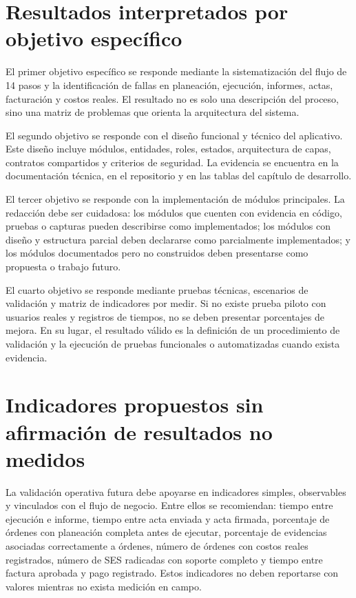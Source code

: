 \section{Resultados interpretados por objetivo específico}
\label{sec:resultados-por-objetivo-especifico}

El primer objetivo específico se responde mediante la sistematización del flujo de 14 pasos y la identificación de fallas en planeación, ejecución, informes, actas, facturación y costos reales. El resultado no es solo una descripción del proceso, sino una matriz de problemas que orienta la arquitectura del sistema.

El segundo objetivo se responde con el diseño funcional y técnico del aplicativo. Este diseño incluye módulos, entidades, roles, estados, arquitectura de capas, contratos compartidos y criterios de seguridad. La evidencia se encuentra en la documentación técnica, en el repositorio y en las tablas del capítulo de desarrollo.

El tercer objetivo se responde con la implementación de módulos principales. La redacción debe ser cuidadosa: los módulos que cuenten con evidencia en código, pruebas o capturas pueden describirse como implementados; los módulos con diseño y estructura parcial deben declararse como parcialmente implementados; y los módulos documentados pero no construidos deben presentarse como propuesta o trabajo futuro.

El cuarto objetivo se responde mediante pruebas técnicas, escenarios de validación y matriz de indicadores por medir. Si no existe prueba piloto con usuarios reales y registros de tiempos, no se deben presentar porcentajes de mejora. En su lugar, el resultado válido es la definición de un procedimiento de validación y la ejecución de pruebas funcionales o automatizadas cuando exista evidencia.

\section{Indicadores propuestos sin afirmación de resultados no medidos}
\label{sec:indicadores-propuestos-no-medidos}

La validación operativa futura debe apoyarse en indicadores simples, observables y vinculados con el flujo de negocio. Entre ellos se recomiendan: tiempo entre ejecución e informe, tiempo entre acta enviada y acta firmada, porcentaje de órdenes con planeación completa antes de ejecutar, porcentaje de evidencias asociadas correctamente a órdenes, número de órdenes con costos reales registrados, número de SES radicadas con soporte completo y tiempo entre factura aprobada y pago registrado. Estos indicadores no deben reportarse con valores mientras no exista medición en campo.

